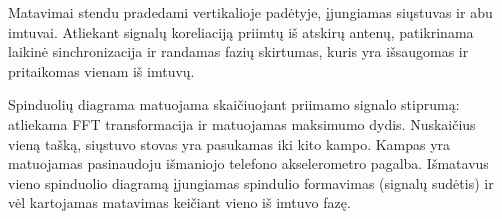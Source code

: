 \documentclass[main.tex]{subfiles}
\begin{document}
Matavimai stendu pradedami vertikalioje padėtyje, įjungiamas siųstuvas ir abu imtuvai.
Atliekant signalų koreliaciją priimtų iš atskirų antenų, patikrinama laikinė sinchronizacija
ir randamas fazių skirtumas, kuris yra išsaugomas ir pritaikomas vienam iš imtuvų.

Spinduolių diagrama matuojama skaičiuojant priimamo signalo stiprumą: atliekama FFT
transformacija ir matuojamas maksimumo dydis. Nuskaičius vieną tašką, siųstuvo stovas
yra pasukamas iki kito kampo. Kampas yra matuojamas pasinaudoju išmaniojo telefono
akselerometro pagalba. Išmatavus vieno spinduolio diagramą įjungiamas spindulio formavimas
(signalų sudėtis) ir vėl kartojamas matavimas keičiant vieno iš imtuvo fazę.
\end{document}
